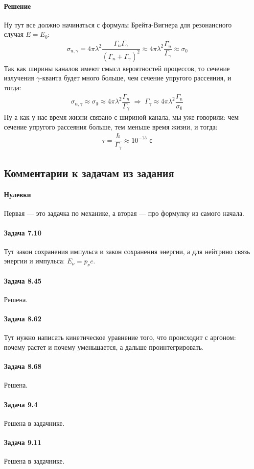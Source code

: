 \documentclass[12pt]{article}
\begin{document}
\paragraph{Решение}
Ну тут все должно начинаться с формулы Брейта-Вигнера для резонансного случая $E = E_0$:
\begin{gather*}
    \sigma_{n, \gamma} = 4\pi \lambda^2 \dfrac{\Gamma_n \Gamma_{\gamma}}{(\Gamma_n +\Gamma_{\gamma})^2} \approx 4\pi \lambda^2 \dfrac{\Gamma_n}{\Gamma_{\gamma}} \approx \sigma_0
\end{gather*}
Так как ширины каналов имеют смысл вероятностей процессов, то сечение излучения $\gamma$-кванта будет много больше, чем сечение упругого рассеяния, и тогда:
\begin{gather*}
    \sigma_{n, \gamma}  \approx \sigma_0 \approx 4\pi \lambda^2 \dfrac{\Gamma_n}{\Gamma_{\gamma}} \;\Rightarrow\; \Gamma_{\gamma} \approx  4\pi \lambda^2 \dfrac{\Gamma_n}{\sigma_0}
\end{gather*}
Ну а как у нас время жизни связано с шириной канала, мы уже говорили: чем сечение упругого рассеяния больше, тем меньше время жизни, и тогда:
\begin{gather*}
    \tau = \dfrac{\hbar}{\Gamma_{\gamma}} \approx 10^{-15} \text{ с}
\end{gather*}


\subsection{Комментарии к задачам из задания}
\paragraph{Нулевки} Первая --- это задачка по механике, а вторая --- про формулку из самого начала.
\paragraph{Задача 7.10} Тут закон сохранения импульса и закон сохранения энергии, а для нейтрино связь энергии и импульса: $E_{\nu} = p_{\nu}c$.
\paragraph{Задача 8.45} Решена.
\paragraph{Задача 8.62} Тут нужно написать кинетическое уравнение того, что происходит с аргоном: почему растет и почему уменьшается, а дальше проинтегрировать. 
\paragraph{Задача 8.68} Решена.
\paragraph{Задача 9.4} Решена в задачнике.
\paragraph{Задача 9.11} Решена в задачнике.
\end{document}
